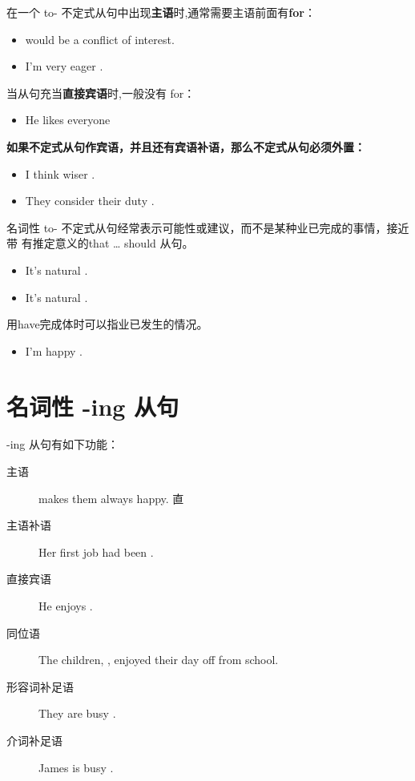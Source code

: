 在一个 to- 不定式从句中出现\textbf{主语}时,通常需要主语前面有\textbf{for}：
\begin{itemize}
\item {} would be a conflict of interest.

\item I'm very eager .
\end{itemize}

当从句充当\textbf{直接宾语}时,一般没有 for：
\begin{itemize}
\item He likes everyone 
\end{itemize}

\textbf{如果不定式从句作宾语，并且还有宾语补语，那么不定式从句必须外置：}
\begin{itemize}
\item I think  wiser .

\item They consider  their duty .
\end{itemize}

名词性 to- 不定式从句经常表示可能性或建议，而不是某种业已完成的事情，接近带
有推定意义的that \ldots{} should 从句。
\begin{itemize}
\item It's natural .

\item It's natural .
\end{itemize}

用have完成体时可以指业已发生的情况。
\begin{itemize}
\item I'm happy .
\end{itemize}

\section{名词性 -ing 从句}

-ing 从句有如下功能：
\begin{description}
\item[主语]  makes them always happy.
  直
\item[主语补语] Her first job had been .
\item[直接宾语] He enjoys .
\item[同位语] The children, , enjoyed
  their day off from school.
\item[形容词补足语] They are busy .
\item[介词补足语] James is busy .
\end{description}


